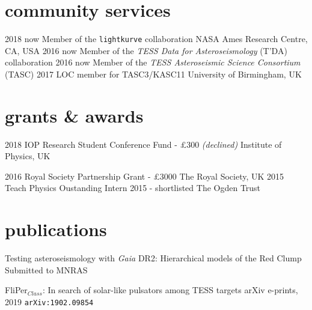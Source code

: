 \documentclass[]{k-cv} %
\begin{document}
\section{community services}
\begin{entrylist}
\entrythree
{2018 \to now}
{Member of the \texttt{lightkurve} collaboration}
{NASA Ames Research Centre, CA, USA}
\entrythree
{2016 \to now}
{Member of the \emph{TESS Data for Asteroseismology} (T'DA) collaboration }
{}
\entrythree
{2016 \to now}
{Member of the \emph{TESS Asteroseismic Science Consortium} (TASC)}
{}
\entrythree
{2017}
{LOC member for TASC3/KASC11}
{University of Birmingham, UK}

\end{entrylist}

\clearpage
{}

\section{grants \& awards}

\begin{entrylist}
\entrythree
{2018}
{IOP Research Student Conference Fund - \pounds 300 \emph{(declined)}}
{Institute of Physics, UK}

\entrythree
{2016}
{Royal Society Partnership Grant - \pounds 3000}
{The Royal Society, UK}
\entrythree
{2015}
{Teach Physics Oustanding Intern 2015 - shortlisted}
{The Ogden Trust}

\end{entrylist}

\section{publications}
{Testing asteroseismology with \textit{Gaia} DR2: Hierarchical models of the Red Clump}
{Submitted to MNRAS}
{}


{FliPer$_{Class}$: In search of solar-like pulsators among TESS targets}
{arXiv e-prints, 2019}
{\texttt{arXiv:1902.09854}}
\end{document}
